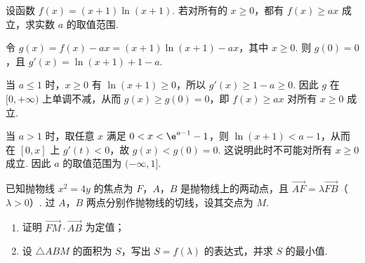 \begin{problem}
设函数 \(f(x) = (x + 1)\ln (x + 1)\). 若对所有的 \(x \geqslant 0\)，都有 \(f(x) \geqslant ax\) 成立，求实数 \(a\) 的取值范围.
\end{problem}

\begin{solution}
令 \(g(x)=f(x)-ax=(x+1)\ln(x+1)-ax\)，其中 \(x\geq0\). 则 \(g(0)=0\)，且 \(g'(x)=\ln(x+1)+1-a\).

当 \(a\leq1\) 时，\(x\geq0\) 有 \(\ln(x+1)\geq0\)，所以 \(g'(x)\geq1-a\geq0\). 因此 \(g\) 在 \([0,+\infty)\) 上单调不减，从而 \(g(x)\geq g(0)=0\)，即 \(f(x)\geq ax\) 对所有 \(x\geq0\) 成立.

当 \(a>1\) 时，取任意 \(x\) 满足 \(0<x<\e^{a-1}-1\)，则 \(\ln(x+1)<a-1\)，从而在 \([0,x]\) 上 \(g'(t)<0\)，故 \(g(x)<g(0)=0\). 这说明此时不可能对所有 \(x\geq0\) 成立. 因此 \(a\) 的取值范围为 \((-\infty,1]\).
\end{solution}

\begin{problem}
已知抛物线 \(x^{2} = 4y\) 的焦点为 \(F\)，\(A\)，\(B\) 是抛物线上的两动点，且 \(\overrightarrow{AF} = \lambda \overrightarrow{FB}\)（\(\lambda > 0\)）. 过 \(A\)，\(B\) 两点分别作抛物线的切线，设其交点为 \(M\).

\begin{enumerate}
\item 证明 \(\overrightarrow{FM} \cdot \overrightarrow{AB}\) 为定值；
\item 设 \(\triangle ABM\) 的面积为 \(S\)，写出 \(S = f(\lambda)\) 的表达式，并求 \(S\) 的最小值.
\end{enumerate}
\end{problem}

